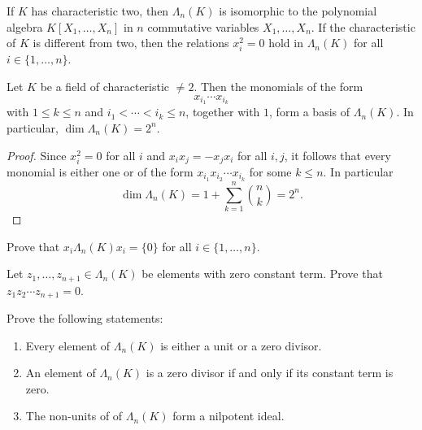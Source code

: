 If $K$ has characteristic two, then $\Lambda_n(K)$ is isomorphic to 
the polynomial algebra $K[X_1,\dots,X_n]$ in $n$ commutative variables $X_1,\dots,X_n$. If the characteristic 
of $K$ is different from two, then the relations 
$x_i^2=0$ hold in $\Lambda_n(K)$ 
for all $i\in\{1,\dots,n\}$. 


\begin{theorem}
    Let $K$ be a field of characteristic $\ne2$. Then 
    the monomials of the form 
    \[
    x_{i_1}\cdots x_{i_k}
    \]
    with $1\leq k\leq n$ and $i_1<\cdots<i_k\leq n$, together with $1$, form 
    a basis of $\Lambda_n(K)$. In particular, $\dim\Lambda_n(K)=2^n$. 
\end{theorem}

\begin{proof}
    Since $x_i^2=0$ for all $i$ and $x_ix_j=-x_jx_i$ for all $i,j$, it follows that 
    every monomial is either one or of the form $x_{i_1}x_{i_2}\cdots x_{i_k}$ 
    for some $k\leq n$. In particular 
    \[
    \dim\Lambda_n(K)=1+\sum_{k=1}^n\binom{n}{k}=2^n.
    \]
\end{proof}

\begin{exercise}
    Prove that $x_i\Lambda_n(K)x_i=\{0\}$ for all $i\in\{1,\dots,n\}$. 
\end{exercise}


\begin{exercise}
    Let $z_1,\dots,z_{n+1}\in\Lambda_n(K)$ be elements with zero constant term. Prove that 
    $z_1z_2\cdots z_{n+1}=0$. 
\end{exercise}


\begin{exercise}
    Prove the following statements:
    \begin{enumerate}
        \item Every element of $\Lambda_n(K)$ is either a unit or a zero divisor. 
        \item An element of $\Lambda_n(K)$ is a zero divisor if and only if its constant term is zero.
        \item The non-units of of $\Lambda_n(K)$ form a nilpotent ideal. 
    \end{enumerate}    
\end{exercise}

